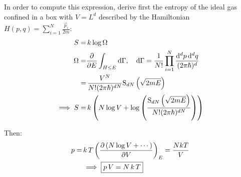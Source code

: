 \documentclass[11pt,a4paper]{scrartcl}
\begin{document}
    In order to compute this expression, derive first the entropy of the ideal
    gas confined in a box with $V=L^d$ described by the Hamiltonian $H(p,q)=\sum_{i=1}^{N}\frac{\vec{p}_i}{2m}$:
    \begin{align*}
        S=&\,k\log\Omega \\
        \Omega=&\pdv{E}\int_{H\le E}\dd\Gamma
        \qc\dd\Gamma=\frac{1}{N!}\prod_{i=1}^{N}\frac{\dd[d]{p}\dd[d]{q}}{(2\pi\hbar)^d} \\
        =&\,\frac{V^N}{N!(2\pi\hbar)^{dN}}\mathrm{S}_{dN}\left(\sqrt{2mE}\right) \\
        \implies S=&\,k\left(N\log V +
        \log\left(\frac{\mathrm{S}_{dN}\left(\sqrt{2mE}\right)}{N!(2\pi\hbar)^{dN}}\right)\right)
    \end{align*}

    Then:
    \begin{align*}
        p=&\,k\,T\left(\pdv{\left(N\log V + \cdots\right)}{V}\right)_E
        =\frac{NkT}{V} \\
        &\implies \boxed{p\,V=N\,k\,T}
    \end{align*}
\end{document}
